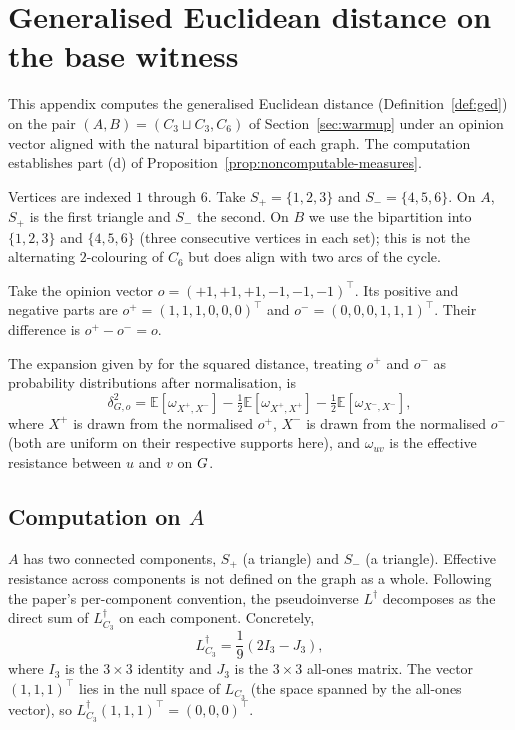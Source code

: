 
\section{Generalised Euclidean distance on the base witness}\label{app:ged-witness}

This appendix computes the generalised Euclidean distance
(Definition~\ref{def:ged}) on the pair $(A, B) = (C_3 \sqcup C_3, C_6)$ of
Section~\ref{sec:warmup} under an opinion vector aligned with the natural
bipartition of each graph. The computation establishes part (d) of
Proposition~\ref{prop:noncomputable-measures}.

Vertices are indexed $1$ through $6$. Take $S_+ = \{1, 2, 3\}$ and
$S_- = \{4, 5, 6\}$. On $A$, $S_+$ is the first triangle and $S_-$
the second. On $B$ we use the bipartition into $\{1, 2, 3\}$ and
$\{4, 5, 6\}$ (three consecutive vertices in each set); this is not
the alternating $2$-colouring of $C_6$ but does align with two arcs
of the cycle.

Take the opinion vector $o = (+1, +1, +1, -1, -1, -1)^\top$. Its
positive and negative parts are $o^+ = (1, 1, 1, 0, 0, 0)^\top$ and
$o^- = (0, 0, 0, 1, 1, 1)^\top$. Their difference is $o^+ - o^- = o$.

The expansion given by \citet{HohmannGED2023} for the squared
distance, treating $o^+$ and $o^-$ as probability distributions after
normalisation, is
\[
\delta_{G,o}^2 = \mathbb{E}[\omega_{X^+, X^-}] - \tfrac{1}{2}\mathbb{E}[\omega_{X^+, X^+}] - \tfrac{1}{2}\mathbb{E}[\omega_{X^-, X^-}],
\]
where $X^+$ is drawn from the normalised $o^+$, $X^-$ is drawn from
the normalised $o^-$ (both are uniform on their respective supports
here), and $\omega_{uv}$ is the effective resistance between $u$ and
$v$ on $G$.

\subsection*{Computation on $A$}

$A$ has two connected components, $S_+$ (a triangle) and $S_-$ (a
triangle). Effective resistance across components is not defined on
the graph as a whole. Following the paper's per-component convention,
the pseudoinverse $L^\dagger$ decomposes as the direct sum of
$L_{C_3}^\dagger$ on each component. Concretely,
\[
L_{C_3}^\dagger = \frac{1}{9}(2 I_3 - J_3),
\]
where $I_3$ is the $3\times 3$ identity and $J_3$ is the $3 \times 3$
all-ones matrix. The vector $(1, 1, 1)^\top$ lies in the null space
of $L_{C_3}$ (the space spanned by the all-ones vector), so
$L_{C_3}^\dagger (1, 1, 1)^\top = (0, 0, 0)^\top$.

